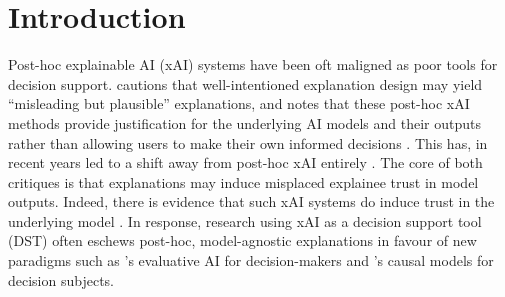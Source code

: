 
\minitoc

\section{Introduction}
Post-hoc explainable AI (xAI) systems have been oft maligned as poor tools for decision support. \textcite{Lipton} cautions that well-intentioned explanation design may yield ``misleading but plausible'' explanations, and \textcite{miller_explainable_2023} notes that these post-hoc xAI methods provide justification for the underlying AI models and their outputs rather than allowing users to make their own informed decisions \cite{miller_explainable_2023}. This has, in recent years led to a shift away from post-hoc xAI entirely \cite{Lipton,miller_explainable_2023,kumar_problems_2020,Bastounis_Campodonico_vanderSchaar_Adcock_Hansen_2024}. The core of both critiques is that explanations may induce misplaced explainee trust in model outputs. Indeed, there is evidence that such xAI systems do induce trust in the underlying model \cite{lai_human_2019,jacobs_how_2021}. In response, research using xAI as a decision support tool (DST) often eschews post-hoc, model-agnostic explanations in favour of new paradigms such as \textcite{miller_explainable_2023}'s evaluative AI for decision-makers and \textcite{karimi_algorithmic_2021}'s causal models for decision subjects.

